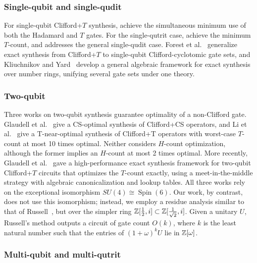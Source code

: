 \documentclass[reprint,amsmath,amssymb,aps,pra]{revtex4-2}
\begin{document}
\subsubsection{Single-qubit and single-qudit}
For single-qubit Clifford+$T$ synthesis,
\cite{matsumoto2008,kliuchnikov2013fast,giles2013remarks} achieve the
simultaneous minimum use of both the Hadamard and $T$ gates. For the
single-qutrit case, \cite{Glaudell_2019,Prakash2018} achieve the
minimum $T$-count, and \cite{Amolak2020} addresses the general
single-qudit case. Forest et al.~\cite{Forest2015} generalize exact
synthesis from Clifford+$T$ to single-qubit Clifford-cyclotomic gate
sets, and Kliuchnikov and Yard~\cite{KliuchnikovYard2015} develop a
general algebraic framework for exact synthesis over number rings,
unifying several gate sets under one theory.

\subsubsection{Two-qubit}

Three works on two-qubit synthesis guarantee optimality of a
non-Clifford gate. Glaudell et al.~\cite{Glaudell2021} give a
CS-optimal synthesis of Clifford+CS operators, and Li et
al.~\cite{Li_2023_CT2} give a T-near-optimal synthesis of Clifford+T
operators with worst-case $T$-count at most 10 times optimal. Neither
considers $H$-count optimization, although the former implies an
$H$-count at most 2 times optimal. More recently, Glaudell et
al.~\cite{GlaudellJarret2026} gave a high-performance exact synthesis
framework for two-qubit Clifford+$T$ circuits that optimizes the
$T$-count exactly, using a meet-in-the-middle strategy with algebraic
canonicalization and lookup tables. All three works rely on the
exceptional isomorphism $SU(4) \cong \operatorname{Spin}(6)$. Our
work, by contrast, does not use this isomorphism; instead, we employ
a residue analysis similar to that of Russell~\cite{russell2014}, but
over the simpler ring
$\mathbb{Z}[\tfrac{1}{2}, i] \subset \mathbb{Z}[\tfrac{1}{\sqrt 2}, i]$. Given a
unitary $U$, Russell's method outputs a circuit of gate count
$O(k)$, where $k$ is the least natural number such that the entries
of $(1+\omega)^k U$ lie in $\mathbb{Z}[\omega]$.

\subsubsection{Multi-qubit and multi-qutrit}
\end{document}
